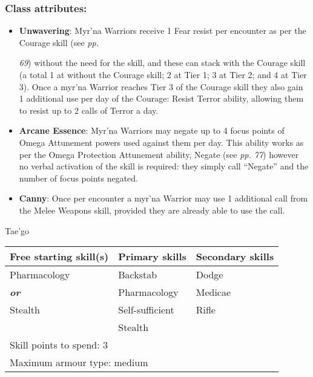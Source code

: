 \subsubsection{Class attributes:}

\begin{itemize}
\item \textbf{Unwavering}: Myr'na Warriors receive 1 Fear resist per encounter as per the Courage skill (see \textit{pp.}

\textit{69}) without the need for the skill, and these can stack with the Courage skill (a total 1 at without the Courage skill; 2 at Tier 1; 3 at Tier 2; and 4 at Tier 3). Once a myr'na Warrior reaches Tier 3 of the Courage skill they also gain 1 additional use per day of the Courage: Resist Terror ability, allowing them to resist up to 2 calls of Terror a day.

\item \textbf{Arcane Essence}: Myr'na Warriors may negate up to 4 focus points of Omega Attunement powers used against them per day. This ability works as per the Omega Protection Attunement ability, Negate (see \textit{pp. 77}) however no verbal activation of the skill is required: they simply call ``Negate'' and the number of focus points negated.

\item \textbf{Canny}: Once per encounter a myr'na Warrior may use 1 additional call from the Melee Weapons skill, provided they are already able to use the call.

\end{itemize}
Tae'go

\begin{table}[H]
\begin{tabular}{|l|l|l|} \hline 
Free starting skill(s) & Primary skills & Secondary skills \\
 \hline Pharmacology & Backstab & Dodge \\
 \hline \textbf{\textit{or}} & Pharmacology & Medicae \\
 \hline Stealth & Self-sufficient & Rifle \\
 \hline  & Stealth &  \\
 \hline \multicolumn{3}{|l|}{Skill points to spend: 3} \\
 \hline \multicolumn{3}{|l|}{Maximum armour type: medium} \\
 \hline \end{tabular}

\end{table}

